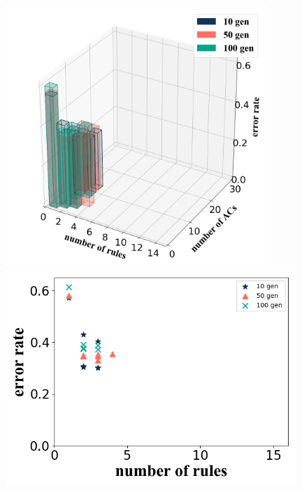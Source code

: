\documentclass[conference]{IEEEtran}
\begin{document}
\begin{figure}[H]
    \centering
    \begin{minipage}[t]{0.40\textwidth}
    \includegraphics[width=0.88\textwidth]{figures/diffGenTest1.png}
    \end{minipage}
    \centering
    \begin{minipage}[t]{0.25\textwidth}
    \includegraphics[width=0.98\textwidth]{figures/diffGenTest2.png}
    \end{minipage}%
    \centering

\end{figure}
\end{document}

